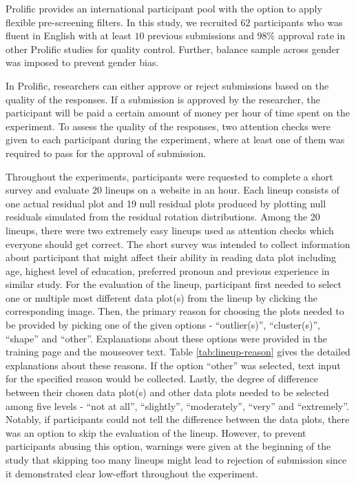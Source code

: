 \documentclass{monashthesis}
\theoremstyle{definition}
\theoremstyle{definition}
\theoremstyle{definition}
\theoremstyle{definition}
\theoremstyle{remark}
\begin{document}
Prolific provides an international participant pool with the option to apply flexible pre-screening filters. In this study, we recruited \(62\) participants who was fluent in English with at least \(10\) previous submissions and \(98\)\% approval rate in other Prolific studies for quality control. Further, balance sample across gender was imposed to prevent gender bias.

In Prolific, researchers can either approve or reject submissions based on the quality of the responses. If a submission is approved by the researcher, the participant will be paid a certain amount of money per hour of time spent on the experiment. To assess the quality of the responses, two attention checks were given to each participant during the experiment, where at least one of them was required to pass for the approval of submission.

Throughout the experiments, participants were requested to complete a short survey and evaluate 20 lineups on a website in an hour. Each lineup consists of one actual residual plot and 19 null residual plots produced by plotting null residuals simulated from the residual rotation distributions. Among the 20 lineups, there were two extremely easy lineups used as attention checks which everyone should get correct. The short survey was intended to collect information about participant that might affect their ability in reading data plot including age, highest level of education, preferred pronoun and previous experience in similar study. For the evaluation of the lineup, participant first needed to select one or multiple most different data plot(s) from the lineup by clicking the corresponding image. Then, the primary reason for choosing the plots needed to be provided by picking one of the given options - ``outlier(s)'', ``cluster(s)'', ``shape'' and ``other''. Explanations about these options were provided in the training page and the mouseover text. Table \ref{tab:lineup-reason} gives the detailed explanations about these reasons. If the option ``other'' was selected, text input for the specified reason would be collected. Lastly, the degree of difference between their chosen data plot(s) and other data plots needed to be selected among five levels - ``not at all'', ``slightly'', ``moderately'', ``very'' and ``extremely''. Notably, if participants could not tell the difference between the data plots, there was an option to skip the evaluation of the lineup. However, to prevent participants abusing this option, warnings were given at the beginning of the study that skipping too many lineups might lead to rejection of submission since it demonstrated clear low-effort throughout the experiment.
\end{document}
